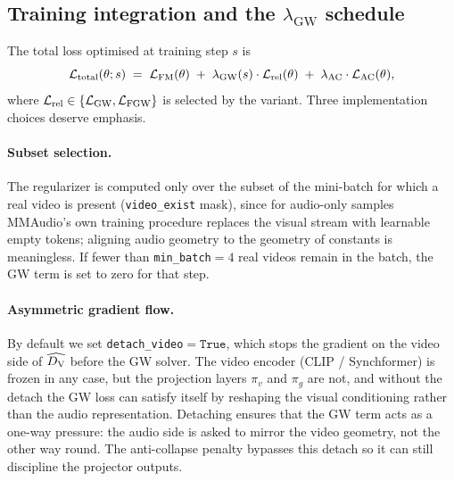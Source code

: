 \subsection{Training integration and the \texorpdfstring{$\lambda_{\mathrm{GW}}$}{lambda\_GW} schedule}
\label{sec:methodology:training}

The total loss optimised at training step $s$ is
\begin{equation}
  \mathcal{L}_{\mathrm{total}}(\theta; s)
  \;=\;
  \mathcal{L}_{\mathrm{FM}}(\theta)
  \;+\;
  \lambda_{\mathrm{GW}}(s) \cdot \mathcal{L}_{\mathrm{rel}}(\theta)
  \;+\;
  \lambda_{\mathrm{AC}} \cdot \mathcal{L}_{\mathrm{AC}}(\theta),
  \label{eq:total_loss}
\end{equation}
where $\mathcal{L}_{\mathrm{rel}} \in \{\mathcal{L}_{\mathrm{GW}}, \mathcal{L}_{\mathrm{FGW}}\}$ is selected
by the variant. Three implementation choices deserve emphasis.

\paragraph{Subset selection.}
The regularizer is computed only over the subset of the mini-batch
for which a real video is present (\texttt{video\_exist} mask),
since for audio-only samples MMAudio's own training procedure
replaces the visual stream with learnable empty tokens; aligning
audio geometry to the geometry of constants is meaningless. If
fewer than \texttt{min\_batch}$=4$ real videos remain in the
batch, the GW term is set to zero for that step.

\paragraph{Asymmetric gradient flow.}
By default we set \texttt{detach\_video}$=\mathtt{True}$, which
stops the gradient on the video side of $\widehat{D_{\mathrm{V}}}$ before the GW
solver. The video encoder (CLIP / Synchformer) is frozen in any
case, but the projection layers $\pi_v$ and $\pi_g$ are not, and
without the detach the GW loss can satisfy itself by reshaping the
visual conditioning rather than the audio representation. Detaching
ensures that the GW term acts as a one-way pressure: the audio side
is asked to mirror the video geometry, not the other way round.
The anti-collapse penalty bypasses this detach so it can still
discipline the projector outputs.

